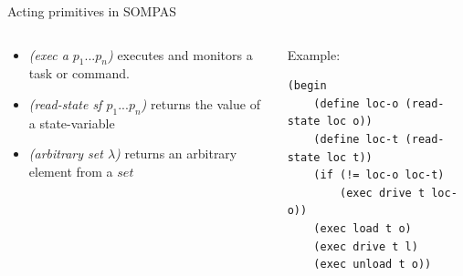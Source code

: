     
    
    

\begin{frame}[fragile]{Acting primitives in SOMPAS}
\begin{columns}
    \begin{column}{0.5\textwidth}
        \begin{itemize}
            \pause
                \item \textit{(exec a $p_1...p_n$)} executes and monitors a task or command.
            \pause
            \pause
                \item \textit{(read-state sf $p_1...p_n$)} returns the value of a state-variable
                \item \textit{(arbitrary set $\lambda$)} returns an arbitrary element from a $set$%
            \end{itemize}
    \end{column}
    \begin{column}{0.5\textwidth}
           
    Example:
\small
    \lstset{columns=fullflexible}
    \begin{lstlisting}
(begin
    (define loc-o (read-state loc o))
    (define loc-t (read-state loc t))
    (if (!= loc-o loc-t)
        (exec drive t loc-o))
    (exec load t o) 
    (exec drive t l)
    (exec unload t o))             
    \end{lstlisting}
    \end{column}
\end{columns}
\end{frame}

